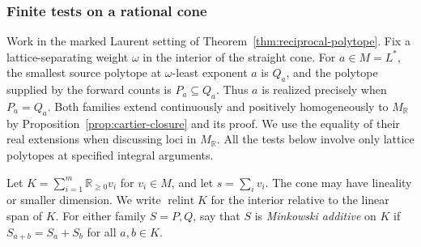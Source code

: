 \documentclass[11pt,reqno]{amsart}
\numberwithin{equation}{section}
\theoremstyle{definition}
\theoremstyle{remark}
\begin{document}
\subsubsection{Finite tests on a rational cone}
\label{subsec:finite-reciprocal-cones}

Work in the marked Laurent setting of
Theorem~\ref{thm:reciprocal-polytope}. Fix a lattice-separating
weight \(\omega\) in the interior of the straight cone. For
\(a\in M=L^*\), the smallest source polytope at \(\omega\)-least
exponent \(a\) is \(Q_a\), and the polytope supplied by the forward
counts is \(P_a\subseteq Q_a\). Thus \(a\) is realized precisely when
\(P_a=Q_a\). Both families extend continuously and positively
homogeneously to \(M_{\mathbb R}\) by
Proposition~\ref{prop:cartier-closure} and its proof. We use the equality
of their real extensions when discussing loci in \(M_{\mathbb R}\).
All the tests below involve only lattice polytopes at specified
integral arguments.

Let \(K=\sum_{i=1}^m\mathbb R_{\ge0}v_i\) for \(v_i\in M\), and let
\(s=\sum_i v_i\). The cone may have lineality or smaller dimension.
We write \(\operatorname{relint}K\) for the interior relative to the
linear span of \(K\). For either family \(S=P,Q\), say that \(S\) is \emph{Minkowski additive} on
\(K\) if \(S_{a+b}=S_a+S_b\) for all \(a,b\in K\).
\end{document}
